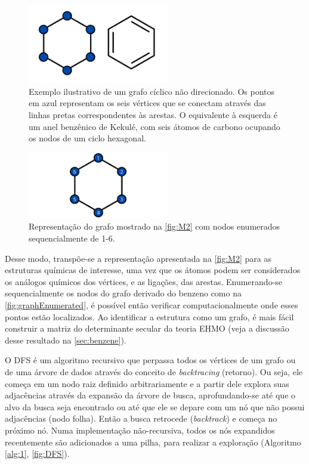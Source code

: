 \begin{figure}[htb]
	\caption{\label{fig:M2} Exemplo ilustrativo de um grafo cíclico não direcionado. Os pontos em azul representam os seis vértices que se conectam através das linhas pretas correspondentes às arestas. O equivalente à esquerda é um anel benzênico de Kekulé, com seis átomos de carbono ocupando os nodos de um ciclo hexagonal.}
	\begin{center}
		\includegraphics[width=0.55\textwidth]{images/grafo(2).png}
	\end{center}
\end{figure}

\begin{figure}[htb]
\caption{\label{fig:graphEnumerated}Representação do grafo mostrado na \autoref{fig:M2} com nodos enumerados sequencialmente de 1-6.}
	\begin{center}
		\includegraphics[width=0.55\textwidth]{images/graphEnumerated.png}
	\end{center}
\end{figure}

Desse modo, transpõe-se a representação apresentada na \autoref{fig:M2} para as estruturas químicas de interesse, uma vez que os átomos podem ser considerados os análogos químicos dos vértices, e as ligações, das arestas. Enumerando-se sequencialmente os nodos do grafo derivado do benzeno como na \autoref{fig:graphEnumerated}, é possível então verificar computacionalmente onde esses pontos estão localizados. Ao identificar a estrutura como um grafo, é mais fácil construir a matriz do determinante secular da teoria \gls{EHMO} (veja a discussão desse resultado na \autoref{sec:benzene}). 

O \gls{DFS}\autocite{Knuth1997-jf, Goodrich2001-pd} é um algoritmo recursivo que perpassa todos os vértices de um grafo ou de uma árvore de dados através do conceito de \textit{backtracing} (retorno). Ou seja, ele começa em um nodo raiz definido arbitrariamente e a partir dele explora suas adjacências através da expansão da árvore de busca, aprofundando-se até que o alvo da busca seja encontrado ou até que ele se depare com um nó que não possui adjacências (nodo folha). Então a busca retrocede (\textit{backtrack}) e começa no próximo nó. Numa implementação não-recursiva, todos os nós expandidos recentemente são adicionados a uma pilha, para realizar a exploração (Algoritmo \ref{alg:1}, \autoref{fig:DFS}).

